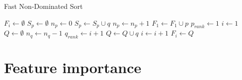 \documentclass[UKenglish]{uiomasterthesis}
\begin{document}
\begin{algorithm}
\caption{Fast Non-Dominated Sort}
\label{alg:fnds}
\begin{algorithmic}
    \State $F_i \gets \emptyset$
    \State $S_p \gets \emptyset$
    \State $n_p \gets 0$
                \State $S_p \gets S_p \cup q$
                \State $n_p \gets n_p + 1$
            \EndIf
        \EndFor
            \State $F_1 \gets F_1 \cup p$
            \State $p_{rank} \gets 1$
        \EndIf
    \EndFor
    \State $i \gets 1$
        \State $Q \gets \emptyset$
                \State $n_q \gets n_q - 1$
                    \State $q_{rank} \gets i + 1$
                    \State $Q \gets Q \cup q$
                \EndIf
            \EndFor
        \EndFor
        \State $i \gets i + 1$
        \State $F_i \gets Q$
    \EndWhile
\end{algorithmic}
\end{algorithm}


\section{Feature importance}
\end{document}
